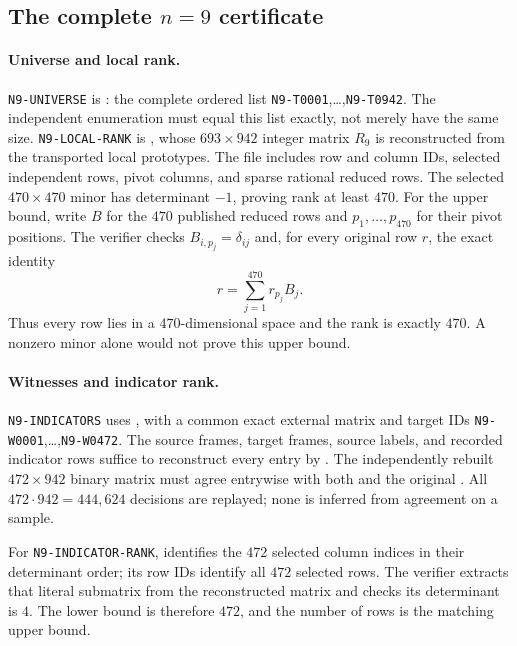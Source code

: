 \documentclass[11pt]{article}
\newcommand{\1}{\mathbf 1}
\begin{document}
\subsection{The complete \texorpdfstring{$n=9$}{n=9} certificate}
\label{cert:N9-UNIVERSE}\label{cert:N9-LOCAL-RANK}
\label{cert:N9-INDICATORS}\label{cert:N9-INDICATOR-RANK}
\label{cert:N9-ANNIHILATION}\label{cert:N9-KERNEL}

\paragraph{Universe and local rank.}
\texttt{N9-UNIVERSE} is
: the complete ordered list
\texttt{N9-T0001},\dots,\texttt{N9-T0942}.  The independent enumeration
must equal this list exactly, not merely have the same size.
\texttt{N9-LOCAL-RANK} is , whose
$693\times942$ integer matrix $R_9$ is reconstructed from the transported
local prototypes.  The file includes row and column IDs, selected
independent rows, pivot columns, and sparse rational reduced rows.
The selected $470\times470$ minor has determinant $-1$, proving rank at
least $470$.  For the upper bound, write $B$ for the $470$ published
reduced rows and $p_1,\dots,p_{470}$ for their pivot positions.
The verifier checks $B_{i,p_j}=\delta_{ij}$ and, for every original row
$r$, the exact identity
\[
r=\sum_{j=1}^{470}r_{p_j}B_j.
\]
Thus every row lies in a $470$-dimensional space and the rank is exactly
$470$.  A nonzero minor alone would not prove this upper bound.

\paragraph{Witnesses and indicator rank.}
\texttt{N9-INDICATORS} uses
, with a common exact external matrix
and target IDs \texttt{N9-W0001},\dots,\texttt{N9-W0472}.
The source frames, target frames, source labels, and recorded indicator
rows suffice to reconstruct every entry by .
The independently rebuilt $472\times942$ binary matrix must agree
entrywise with both  and the original
.  All
$472\cdot942=444{,}624$ decisions are replayed; none is inferred from
agreement on a sample.

For \texttt{N9-INDICATOR-RANK}, 
identifies the $472$ selected column indices in their determinant order;
its row IDs identify all $472$ selected rows.  The verifier extracts that
literal submatrix from the reconstructed matrix and checks its determinant
is $4$.  The lower bound is therefore $472$, and the number of rows is
the matching upper bound.
\end{document}

